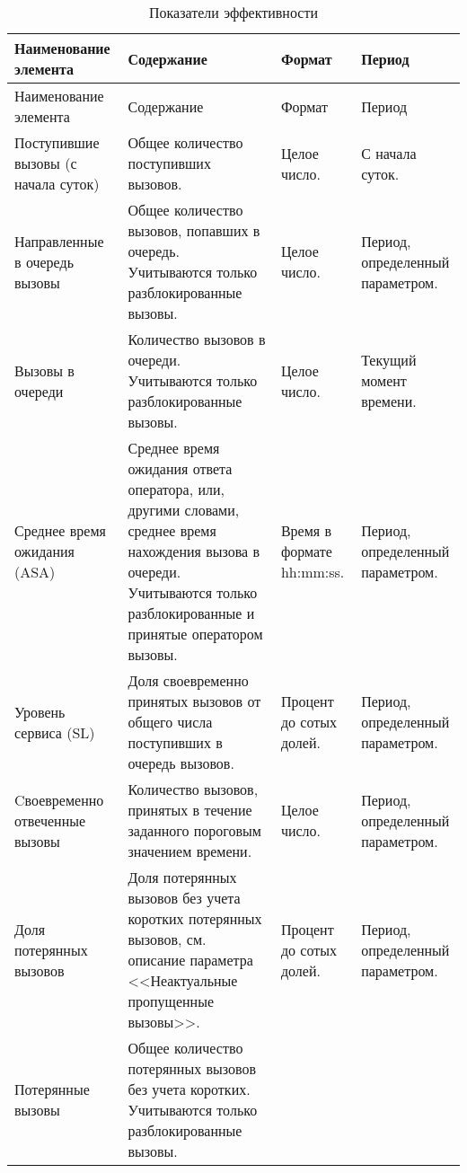 \begin{small}
    \begin{longtable}{|p{}|p{}|p{}|p{}|}
        \caption{Показатели эффективности}
        \label{tab:effectivevalue}
        \\ \hline
        Наименование элемента & Содержание & Формат & Период \\
        \hline \endfirsthead
        \hline
        Наименование элемента & Содержание & Формат & Период \\
        \hline
        \endhead
        \hline \endlastfoot
        Поступившие вызовы (с начала суток) &
        Общее количество поступивших вызовов. &
        Целое число. &
        С начала суток. \\
        \hline
        Направленные в очередь вызовы &
        Общее количество вызовов, попавших в очередь. Учитываются только разблокированные вызовы. &
        Целое число. &
        Период, определенный параметром. \\
        \hline
        Вызовы в очереди &
        Количество вызовов в очереди. Учитываются только разблокированные вызовы. &
        Целое число. &
        Текущий момент времени. \\
        \hline
        Среднее время ожидания (ASA) &
        Среднее время ожидания ответа оператора, или, другими словами, среднее время нахождения вызова в очереди.
        Учитываются только разблокированные и принятые оператором вызовы. &
        Время в формате hh:mm:ss. &
        Период, определенный параметром. \\
        \hline
        Уровень сервиса (SL) &
        Доля своевременно принятых вызовов от общего числа поступивших в очередь вызовов. &
        Процент до сотых долей. &
        Период, определенный параметром. \\
        \hline
        Cвоевременно отвеченные вызовы &
        Количество вызовов, принятых в течение заданного пороговым значением времени. &
        Целое число. &
        Период, определенный параметром. \\
        \hline
        Доля потерянных вызовов &
        Доля потерянных вызовов без учета коротких потерянных вызовов,
        см. описание параметра <<Неактуальные пропущенные вызовы>>. &
        Процент до сотых долей. &
        Период, определенный параметром. \\
        \hline
        Потерянные вызовы &
        Общее количество потерянных вызовов без учета коротких.
        Учитываются только разблокированные вызовы. &

\end{longtable}
\end{small}
